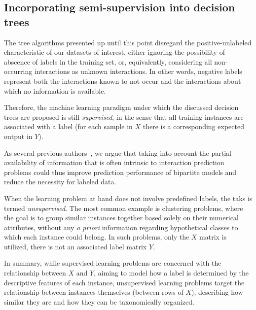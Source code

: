 \subsection{Incorporating semi-supervision into decision trees}
\label{sec:ss trees}

The tree algorithms presented up until this point disregard the positive-unlabeled characteristic of our datasets of interest, either ignoring the possibility of abscence of labels in the training set, or, equivalently, considering all non-occurring interactions as unknown interactions.
In other words, negative labels represent both the interactions known to not occur and the interactions about which no information is available.

Therefore, the machine learning paradigm under which the discussed decision trees are proposed is still \emph{supervised}, in the sense that all training instances are associated with a label (for each sample in $X$ there is a corresponding expected output in $Y$).

As several previous authors~\cite{liu2017lpinrlmf,he2017simboost}, %
we argue that taking into account the partial availability of information that is often intrinsic to interaction prediction problems could thus improve prediction performance of bipartite models and reduce the necessity for labeled data.

When the learning problem at hand does not involve predefined labels, the taks is termed \emph{unsupervised}. The most common example is clustering problems, where the goal is to group similar instances together based solely on their numerical attributes, without any \textit{a priori} information regarding hypothetical classes to which each instance could belong. In such problems, only the $X$ matrix is utilized, there is not an associated label matrix $Y$.

In summary, while supervised learning problems are concerned with the relationship between $X$ and $Y$, aiming to model how a label is determined by the descriptive features of each instance, unsupervised learning problems target the relationship between instances themselves (between rows of $X$), describing how similar they are and how they can be taxonomically organized.

